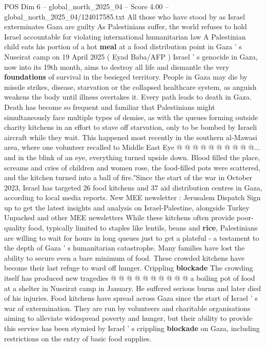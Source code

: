 \begin{textsample}{POS Dim 6 – global\_north\_2025\_04 – Score 4.00 – global\_north\_2025\_04/124017585.txt}  \label{ex:f6_pos_200}
All those who have stood by as Israel exterminates Gaza are guilty As Palestinians suffer, the world refuses to hold Israel accountable for violating international humanitarian law A Palestinian child eats his portion of a hot \textbf{meal} at a food distribution point in Gaza ' s Nuseirat camp on 19 April 2025 ( Eyad Baba/AFP ) Israel ' s genocide in Gaza, now into its 19th month, aims to destroy all life and dismantle the very \textbf{foundations} of survival in the besieged territory.
People in Gaza may die by missile strikes, disease, starvation or the collapsed healthcare system, as anguish weakens the body until illness overtakes it.
Every path leads to death in Gaza.
Death has become so frequent and familiar that Palestinians might simultaneously face multiple types of demise, as with the queues forming outside charity kitchens in an effort to stave off starvation, only to be bombed by Israeli aircraft while they wait.
This happened most recently in the southern al-Mawasi area, where one volunteer recalled to Middle East Eye @ @ @ @ @ @ @ @ @ @... and in the blink of an eye, everything turned upside down.
Blood filled the place, screams and cries of children and women rose, the food-filled pots were scattered, and the kitchen turned into a ball of fire."Since the start of the war in October 2023, Israel has targeted 26 food kitchens and 37 aid distribution centres in Gaza, according to local media reports.
New MEE newsletter : Jerusalem Dispatch Sign up to get the latest insights and analysis on Israel-Palestine, alongside Turkey Unpacked and other MEE newsletters While these kitchens often provide poor-quality food, typically limited to staples like lentils, beans and \textbf{rice}, Palestinians are willing to wait for hours in long queues just to get a plateful - a testament to the depth of Gaza ' s humanitarian catastrophe.
Many families have lost the ability to secure even a bare minimum of food.
These crowded kitchens have become their last refuge to ward off hunger.
Crippling \textbf{blockade} The crowding itself has produced new tragedies @ @ @ @ @ @ @ @ @ @ a boiling pot of food at a shelter in Nuseirat camp in January.
He suffered serious burns and later died of his injuries.
Food kitchens have spread across Gaza since the start of Israel ' s war of extermination.
They are run by volunteers and charitable organisations aiming to alleviate widespread poverty and hunger, but their ability to provide this service has been stymied by Israel ' s crippling \textbf{blockade} on Gaza, including restrictions on the entry of basic food supplies.

\end{textsample}
